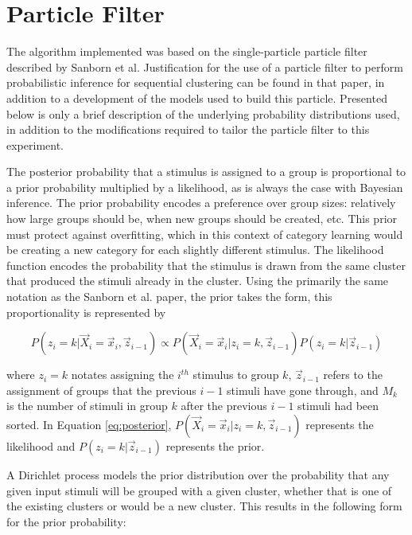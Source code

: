\section{Particle Filter}
\label{sec:filter}
The algorithm implemented was based on the single-particle particle filter
described by Sanborn et al\cite{sanborn2010}. Justification for the use of a
particle filter to perform probabilistic inference for sequential clustering can
be found in that paper, in addition to a development of the models used to build
this particle. Presented below is only a brief description of the underlying
probability distributions used, in addition to the modifications required to
tailor the particle filter to this experiment.

The posterior probability that a stimulus is assigned to a group is proportional
to a prior probability multiplied by a likelihood, as is always the case with
Bayesian inference. The prior probability encodes a preference over group sizes:
relatively how large groups should be, when new groups should be created, etc.
This prior must protect against overfitting, which in this context of category
learning would be creating a new category for each slightly different stimulus.
The likelihood function encodes the probability that the stimulus is drawn from
the same cluster that produced the stimuli already in the cluster. Using the
primarily the same notation as the Sanborn et al. paper, the prior takes the
form, this proportionality is represented by

\begin{equation}
P(z_i = k | \vec{X}_i = \vec{x}_i,  \vec{z}_{i-1}) \propto  P(\vec{X}_i =
\vec{x}_i | z_i = k,  \vec{z}_{i-1}) P(z_i = k | \vec{z}_{i-1})
\label{eq:posterior}
\end{equation}

where $z_i = k$ notates assigning the $i^{th}$ stimulus to group $k$, $\vec{z}_{i-1}$ refers to
the assignment of groups that the previous $i - 1$ stimuli have gone through,
and $M_k$ is the number of stimuli in group $k$ after the previous $i - 1$
stimuli had been sorted. In Equation \ref{eq:posterior}, $P(\vec{X}_i =
\vec{x}_i | z_i = k,  \vec{z}_{i-1})$ represents the likelihood and $P(z_i = k |
\vec{z}_{i-1})$ represents the prior.

A Dirichlet process models the prior distribution over the probability that
any given input stimuli will be grouped with a given cluster, whether that is one
of the existing clusters or would be a new cluster. This results in the
following form for the prior probability:

